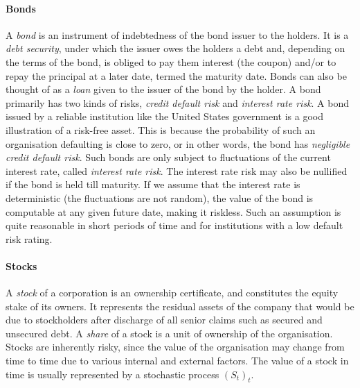 \paragraph{Bonds}
A \emph{bond} is an instrument of indebtedness of the bond issuer to the holders. It is a \emph{debt security}, under which the issuer owes the holders a debt and, depending on the terms of the bond, is obliged to pay them interest (the coupon) and/or to repay the principal at a later date, termed the maturity date. Bonds can also be thought of as a \emph{loan} given to the issuer of the bond by the holder. A bond primarily has two kinds of risks, \emph{credit default risk} and \emph{interest rate risk}. A bond issued by a reliable institution like the United States government is a good illustration of a risk-free asset. This is because the probability of such an organisation defaulting is close to zero, or in other words, the bond has \emph{negligible} \emph{credit default risk}. Such bonds are only subject to fluctuations of the current interest rate, called \emph{interest rate risk}. The interest rate risk may also be nullified if the bond is held till maturity. If we assume that the interest rate is deterministic (the fluctuations are not random), the value of the bond is computable at any given future date, making it riskless. Such an assumption is quite reasonable in short periods of time and for institutions with a low default risk rating.


\paragraph{Stocks}
A \emph{stock} of a corporation is an ownership certificate, and constitutes the equity stake of its owners. It represents the residual assets of the company that would be due to stockholders after discharge of all senior claims such as secured and unsecured debt. A \emph{share} of a stock is a unit of ownership of the organisation. Stocks are inherently risky, since the value of the organisation may change from time to time due to various internal and external factors. The value of a stock in time is usually represented by a stochastic process $ (S_t)_t $.



